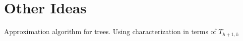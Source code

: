 \documentclass[kpfonts]{patmorin}
\begin{document}
\section{Other Ideas}

Approximation algorithm for trees.  Using characterization in terms of $T_{h+1,h}$















%
%
%
%
%
%
%
%
%
%
%
%
\end{document}
